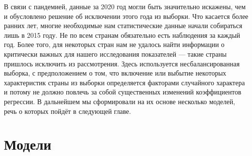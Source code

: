 \documentclass[russian]{vegareport}
\begin{document}
        В связи с пандемией, данные за 2020 год могли быть значительно искажены, чем и обусловлено решение об исключении этого года из выборки. Что касается более ранних лет, многие необходимые нам статистические данные начали собираться лишь в 2015 году. Не по всем странам обязательно есть наблюдения за каждый год. Более того, для некоторых стран нам не удалось найти информации о критически важных для нашего исследования показателей --- такие страны пришлось исключить из рассмотрения. Здесь используется несбалансированная выборка, с предположением о том, что включение или выбытие некоторых характеристик страны из выборки определяется факторами случайного характера и потому не должно повлечь за собой существенных изменений коэффициентов регрессии. В дальнейшем мы сформировали на их основе несколько моделей, речь о которых пойдёт в следующей главе.

    \chapter{Модели}
\end{document}
